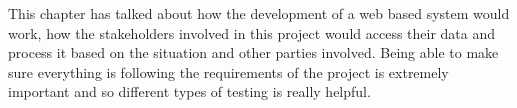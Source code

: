\documentclass[../main.tex]{subfiles}
\begin{document}
\raggedright
This chapter has talked about how the development of a web based system would work, how the stakeholders involved in this project would access their data and process it based on the situation and other parties involved. Being able to make sure everything is following the requirements of the project is extremely important and so different types of testing is really helpful. 
\end{document}
